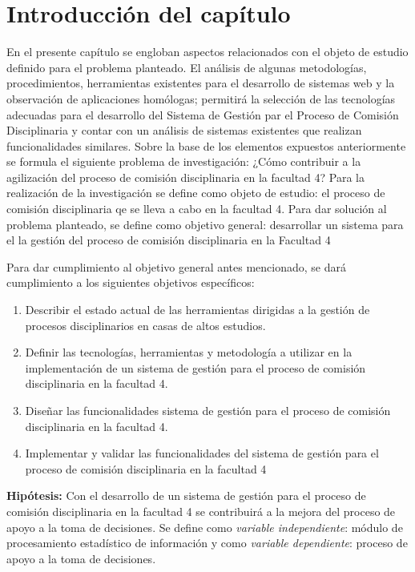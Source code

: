 \section[Introducción]{Introducción del capítulo}
En el presente capítulo se engloban aspectos relacionados con el objeto de estudio definido para el problema planteado. El análisis de algunas metodologías, procedimientos, herramientas existentes para el desarrollo de sistemas web y la observación de aplicaciones homólogas; permitirá la selección de las tecnologías adecuadas para el desarrollo del Sistema de Gestión par el Proceso de Comisión Disciplinaria y contar con un análisis de sistemas existentes que realizan funcionalidades similares.
Sobre la base de los elementos expuestos anteriormente se formula el siguiente problema de investigación: ¿Cómo contribuir a la agilización del proceso de comisión disciplinaria en la facultad 4? Para la realización de la investigación se define como objeto de estudio: el proceso de comisión disciplinaria qe se lleva a cabo en la facultad 4.
Para dar solución al problema planteado, se define como objetivo general: desarrollar un sistema para el la gestión del proceso de comisión disciplinaria en la Facultad 4

Para dar cumplimiento al objetivo general antes mencionado, se dará cumplimiento a los siguientes objetivos específicos:

\begin{enumerate}
	\item Describir el estado actual de las herramientas dirigidas a la gestión de procesos disciplinarios en casas de altos estudios.
	\item Definir las tecnologías, herramientas y metodología a utilizar en la implementación de un sistema de gestión para el proceso de comisión disciplinaria en la facultad 4.	\item Diseñar las funcionalidades sistema de gestión para el proceso de comisión disciplinaria en la facultad 4.
	\item Implementar y validar las funcionalidades del sistema de gestión para el proceso de comisión disciplinaria en la facultad 4
\end{enumerate}

\textbf{Hipótesis:}
Con el desarrollo de un sistema de gestión para el proceso de comisión disciplinaria en la facultad 4 se contribuirá a la mejora del proceso de apoyo a la toma de decisiones.
Se define como \emph{variable independiente}: módulo de procesamiento estadístico de información y como  \emph{variable dependiente}: proceso de apoyo a la toma de decisiones.
